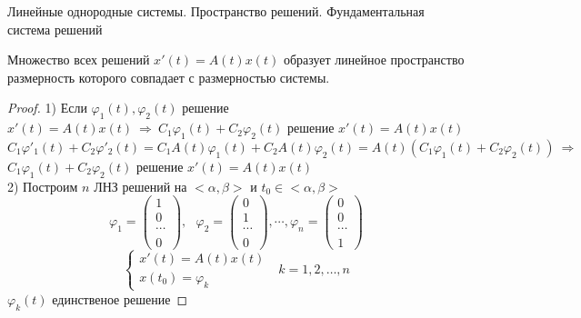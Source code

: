 \begin{title}[\Large]
  Линейные однородные системы. Пространство решений. Фундаментальная система
  решений
\end{title}

\begin{theorem}
  Множество всех решений $x'(t) = A(t)x(t)$ образует
  линейное пространство размерность которого совпадает с размерностью системы.
\end{theorem}

\begin{proof}
  1) Если $\varphi_1(t), \varphi_2(t)$ решение $x'(t) = A(t)x(t) ~ \Rightarrow ~
  C_1\varphi_1(t) + C_2\varphi_2(t)$ решение $x'(t) = A(t)x(t)$
  $$
  C_1 \varphi'_1(t) + C_2 \varphi'_2(t) = C_1A(t) \varphi_1(t) +
  C_2A(t)\varphi_2(t) = A(t)(C_1\varphi_1(t) + C_2\varphi_2(t)) ~ \Rightarrow
  $$
  $C_1 \varphi_1(t) + C_2 \varphi_2(t)$ решение $x'(t) = A(t)x(t)$\\

  2) Построим $n$ ЛНЗ решений на $<\alpha, \beta>$ и $t_0 \in <\alpha, \beta>$
  $$
  \varphi_1 =
  \left(
  \begin{array}{c}
    1 \\
    0 \\
    \cdots \\
    0
  \end{array}
  \right), ~~~
  \varphi_2 =
  \left(
  \begin{array}{c}
    0 \\
    1 \\
    \cdots \\
    0
  \end{array}
  \right), \cdots,
  \varphi_n =
  \left(
  \begin{array}{c}
    0 \\
    0 \\
    \cdots \\
    1
  \end{array}
  \right)
  $$
  $$
  \left\{
  \begin{array}{l}
    x'(t) = A(t)x(t) \\
    x(t_0) = \varphi_k
  \end{array}
  \right. ~~~ k = 1, 2, \ldots, n
  $$
  $\varphi_k(t)$ единственое решение


\end{proof}
